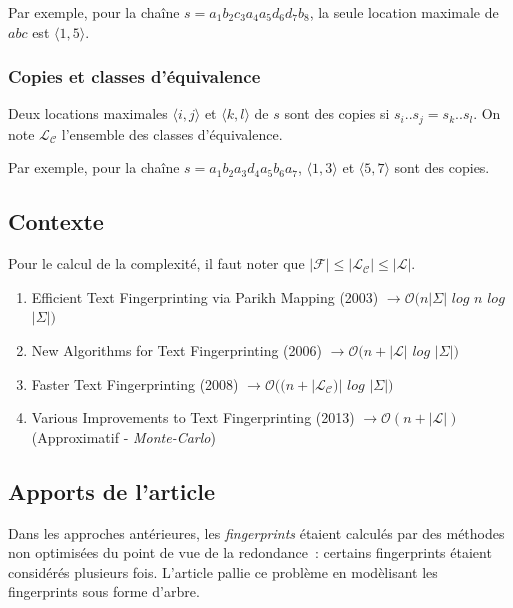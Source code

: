 \documentclass[a4paper]{article}
\begin{document}
Par exemple, pour la chaîne $s = a_{1} b_{2} c_{3} a_{4} a_{5} d_{6} d_{7} b_{8}$, la seule location maximale de $abc$ est $\langle1,5\rangle$.

\subsubsection{Copies et classes d'équivalence}

Deux locations maximales $\langle i,j \rangle$ et $\langle k,l \rangle$ de $s$ sont des copies si $s_{i}..s_{j} = s_{k}..s_{l}$. On note $\mathcal{L}_{\mathcal{C}}$ l'ensemble des classes d'équivalence. \newline

Par exemple, pour la chaîne $s = a_{1} b_{2} a_{3} d_{4} a_{5} b_{6} a_{7}$, $\langle1,3\rangle$ et $\langle5,7\rangle$ sont des copies.

\subsection{Contexte}

Pour le calcul de la complexité, il faut noter que $|\mathcal{F}| \leq |\mathcal{L}_{\mathcal{C}}| \leq |\mathcal{L}|$.

\begin{enumerate}
	\item Efficient Text Fingerprinting via Parikh Mapping (2003) \newline
$\rightarrow \mathcal{O}(n|\Sigma|$ $log$ $n$ $log$ $|\Sigma|)$
	\item New Algorithms for Text Fingerprinting (2006) \newline
$\rightarrow \mathcal{O}(n + |\mathcal{L}|$ $log$ $|\Sigma|)$
	\item Faster Text Fingerprinting (2008) \newline
$\rightarrow \mathcal{O}((n + |\mathcal{L}_{\mathcal{C}})|$ $log$ $|\Sigma|)$
	\item Various Improvements to Text Fingerprinting (2013) \newline
$\rightarrow \mathcal{O}(n + |\mathcal{L}|)$ (Approximatif - \emph{Monte-Carlo})
\end{enumerate}

\subsection{Apports de l'article}

Dans les approches antérieures, les \emph{fingerprints} étaient
calculés par des méthodes non optimisées du point de vue de la
redondance~: certains fingerprints étaient considérés plusieurs
fois. L'article pallie ce problème en modèlisant les fingerprints sous
forme d'arbre.
\end{document}
